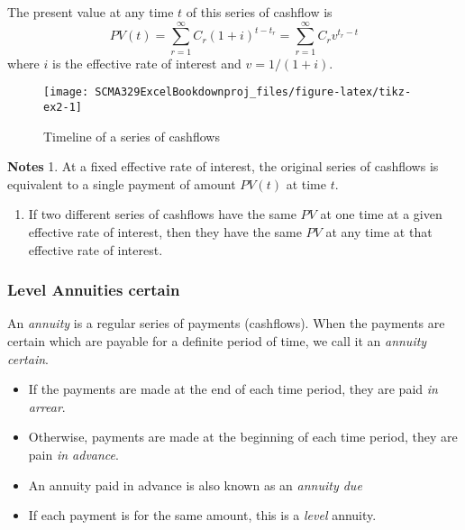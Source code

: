 \documentclass[
]{article}
\providecommand{\tightlist}{%
  \setlength{\itemsep}{0pt}\setlength{\parskip}{0pt}}
\theoremstyle{definition}
\theoremstyle{definition}
\theoremstyle{definition}
\theoremstyle{definition}
\theoremstyle{remark}
\begin{document}
The present value at any time \(t\) of this series of cashflow is
\[PV(t) = \sum_{r=1}^\infty C_r (1 + i)^{t - t_r} = \sum_{r=1}^\infty C_r v^{t _r - t}\]
where \(i\) is the effective rate of interest and \(v = 1/(1+i)\).

\begin{figure}

{\centering \texttt{[image: SCMA329ExcelBookdownproj\_files/figure-latex/tikz-ex2-1]} 

}

\caption{Timeline of a series of cashflows}\label{fig:tikz-ex2}
\end{figure}

\textbf{Notes}
1. At a fixed effective rate of interest, the original series of
cashflows is equivalent to a single payment of amount \(PV(t)\) at
time \(t\).

\begin{enumerate}
\def\labelenumi{\arabic{enumi}.}
\setcounter{enumi}{1}
\tightlist
\item
  If two different series of cashflows have the same \(PV\) at one time
  at a given effective rate of interest, then they have the same \(PV\)
  at any time at that effective rate of interest.
\end{enumerate}

\hypertarget{level-annuities-certain}{%
\subsubsection{Level Annuities certain}\label{level-annuities-certain}}

An \emph{annuity} is a regular series of payments (cashflows). When the
payments are certain which are payable for a definite period of time, we
call it an \emph{annuity certain}.

\begin{itemize}
\item
  If the payments are made at the end of each time period, they are
  paid \emph{in arrear}.
\item
  Otherwise, payments are made at the beginning of each time period,
  they are pain \emph{in advance}.
\item
  An annuity paid in advance is also known as an \emph{annuity due}
\item
  If each payment is for the same amount, this is a \emph{level} annuity.
\end{itemize}
\end{document}
